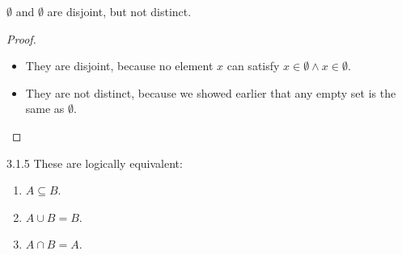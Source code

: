 \begin{why}{34}
	$\emptyset$ and $\emptyset$ are disjoint, but not distinct.
\end{why}
\begin{proof}\leavevmode
	\begin{itemize}
		\item They are disjoint, because no element $x$ can satisfy $x \in \emptyset \wedge x \in \emptyset$.
		\item They are not distinct, because we showed earlier that any empty set is the same as $\emptyset$.
	\end{itemize}
\end{proof}

\begin{exercise}{3.1.5}
These are logically equivalent:
\begin{enumerate}
	\item $A \subseteq B$.
	\item $A \cup B = B$.
	\item $A \cap B = A$.
\end{enumerate}
\end{exercise}
